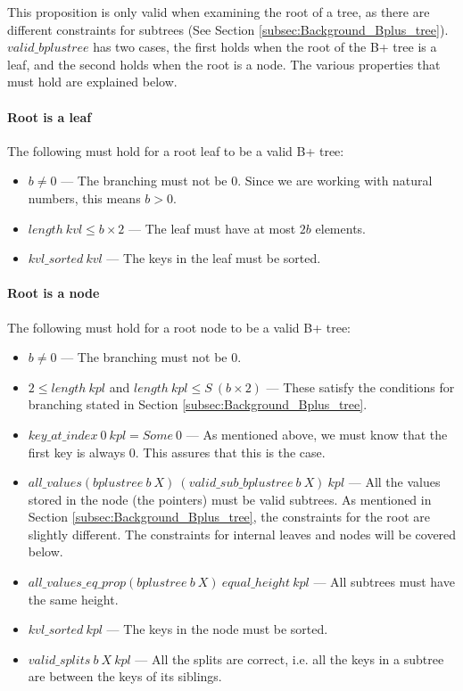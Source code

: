 This proposition is only valid when examining the root of a tree, as there are different constraints for subtrees (See Section \ref{subsec:Background_Bplus_tree}). $valid\_bplustree$ has two cases, the first holds when the root of the B+ tree is a leaf, and the second holds when the root is a node. The various properties that must hold are explained below.

\paragraph{Root is a leaf}
The following must hold for a root leaf to be a valid B+ tree:
\label{valid_root_is_a_leaf}
\begin{itemize}
\item $b \neq 0$ --- The branching must not be 0. Since we are working with natural numbers, this means $b > 0$.
\item $length\ kvl \leq b \times 2 $ --- The leaf must have at most $2b$ elements.
\item $kvl\_sorted\ kvl$ --- The keys in the leaf must be sorted.
\end{itemize}

\paragraph{Root is a node}
The following must hold for a root node to be a valid B+ tree:
\label{valid_root_is_a_node}
\begin{itemize}
\item $b \neq 0$ --- The branching must not be 0.
\item $2 \leq length\ kpl$ and $length\ kpl \leq S\ (b \times 2)$ --- These satisfy the conditions for branching stated in Section \ref{subsec:Background_Bplus_tree}.
\item $key\_at\_index\ 0\ kpl = Some\ 0$ --- As mentioned above, we must know that the first key is always 0. This assures that this is the case.
\item $all\_values (bplustree\ b\ X)\ (valid\_sub\_bplustree\ b\ X)\ kpl$ --- All the values stored in the node (the pointers) must be valid subtrees. As mentioned in Section \ref{subsec:Background_Bplus_tree}, the constraints for the root are slightly different. The constraints for internal leaves and nodes will be covered below.
\item $all\_values\_eq\_prop (bplustree\ b\ X)\ equal\_height\ kpl$ --- All subtrees must have the same height.
\item $kvl\_sorted\ kpl$ --- The keys in the node must be sorted.
\item $valid\_splits\ b \ X\ kpl$ --- All the splits are correct, i.e. all the keys in a subtree are between the keys of its siblings.
\end{itemize}

